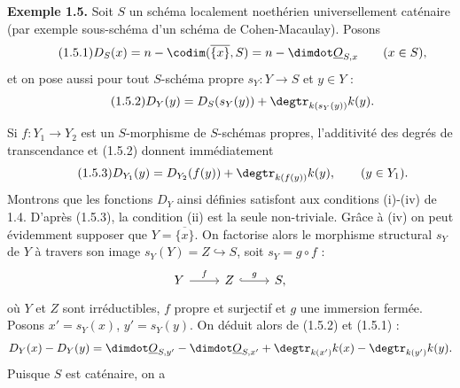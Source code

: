 
\textbf{Exemple 1.5.} Soit $S$ un schéma localement noethérien universellement caténaire (par exemple sous-schéma d'un schéma de Cohen-Macaulay). Posons
\begin{equation}\tag{1.5.1}
D_S(x)=n-\codim(\overline{\{x\}},S)=n-\dimdot\underline{O}_{S,x}\qquad(x\in S),
\end{equation}
et on pose aussi pour tout $S$-schéma propre $s_Y:Y\to S$ et $y\in Y$ :
\begin{equation}\tag{1.5.2}
D_Y(y)=D_S(s_Y(y))+\degtr_{k(s_Y(y))}k(y).
\end{equation}

Si $f:Y_1\to Y_2$ est un $S$-morphisme de $S$-schémas propres, l'additivité des degrés de transcendance et (1.5.2) donnent immédiatement
\begin{equation}\tag{1.5.3}
D_{Y_1}(y)=D_{Y_2}(f(y))+\degtr_{k(f(y))}k(y),\qquad(y\in Y_1).
\end{equation}
Montrons que les fonctions $D_Y$ ainsi définies satisfont aux conditions (i)-(iv) de 1.4. D'après (1.5.3), la condition (ii) est la seule non-triviale. Grâce à (iv) on peut évidemment supposer que $Y=\overline{\{x\}}$. On factorise alors le morphisme structural $s_Y$ de $Y$ à travers son image $s_Y(Y)=Z\hookrightarrow S$, soit $s_Y=g\circ f$ :
\[
\begin{tikzcd}
Y \arrow[r,"f"] & Z \arrow[r,hook,"g"] & S,
\end{tikzcd}
\]
où $Y$ et $Z$ sont irréductibles, $f$ propre et surjectif et $g$ une immersion fermée. Posons $x'=s_Y(x)$, $y'=s_Y(y)$. On déduit
alors de (1.5.2) et (1.5.1) :
\[
D_Y(x)-D_Y(y)=\dimdot\underline{O}_{S,y'}-\dimdot\underline{O}_{S,x'}+\degtr_{k(x')}k(x)-\degtr_{k(y')}k(y).
\]
Puisque $S$ est caténaire, on a
